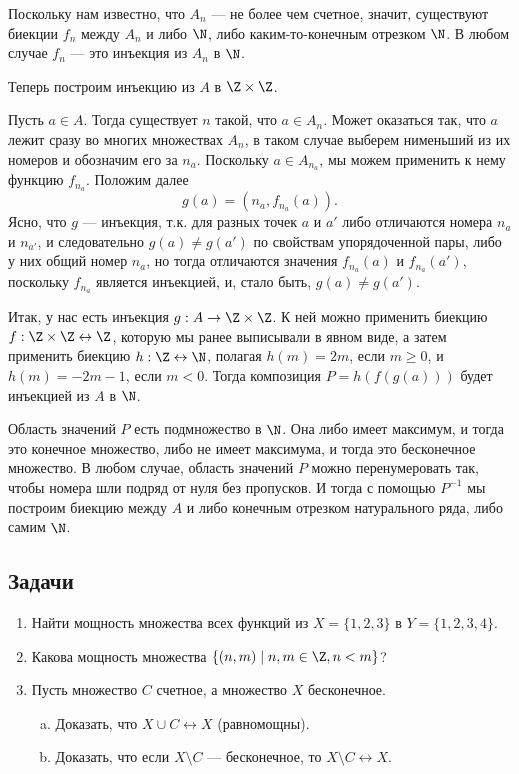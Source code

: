 \begin{enumerate}
Поскольку нам известно, что $A_n$ --- не более чем счетное, значит, существуют биекции $f_n$ между $A_n$ и либо $\N$, либо каким-то-конечным отрезком $\N$. В любом случае $f_n$ --- это инъекция из $A_n$ в $\N$.

Теперь построим инъекцию из $A$ в $\Z\times\Z$.

Пусть $a\in A$. Тогда существует $n$ такой, что $a\in A_n$. Может оказаться так, что $a$ лежит сразу во многих множествах $A_n$, в таком случае выберем нименьший из их номеров и обозначим его за $n_a$. Поскольку $a\in A_{n_a}$, мы можем применить к нему функцию $f_{n_a}$. Положим далее
$$
g(a) = (n_a,f_{n_a}(a)).
$$
Ясно, что $g$ --- инъекция, т.к. для разных точек $a$ и $a'$ либо отличаются номера $n_a$ и $n_{a'}$, и следовательно $g(a)\ne g(a')$ по свойствам упорядоченной пары, либо у них общий номер $n_a$, но тогда отличаются значения $f_{n_a}(a)$ и $f_{n_a}(a')$, поскольку $f_{n_a}$ является инъекцией, и, стало быть, $g(a)\ne g(a')$.

Итак, у нас есть инъекция $g:A\to\Z\times\Z$. К ней можно применить биекцию $f:\Z\times\Z\leftrightarrow\Z$, которую мы ранее выписывали в явном виде, а затем применить биекцию $h:\Z\leftrightarrow\N$, полагая $h(m)=2m$, если $m\ge 0$, и $h(m)=-2m-1$, если $m<0$. Тогда композиция $P=h(f(g(a)))$ будет инъекцией из $A$ в $\N$.

Область значений $P$ есть подмножество в $\N$. Она либо имеет максимум, и тогда это конечное множество, либо не имеет максимума, и тогда это бесконечное множество. В любом случае, область значений $P$ можно перенумеровать так, чтобы номера шли подряд от нуля без пропусков. И тогда с помощью $P^{-1}$ мы построим биекцию между $A$ и либо конечным отрезком натурального ряда, либо самим $\N$.\epf

\end{enumerate}


\subsection*{Задачи}

\begin{enumerate}
\item Найти мощность множества всех функций из $X=\{1,2,3\}$ в $Y=\{1,2,3,4\}$.
\item Какова мощность множества $\{(n,m)\mid n,m\in\Z, n<m\}$?
\item Пусть множество $C$ счетное, а множество $X$ бесконечное.
\begin{enumerate}[a)]
\item Доказать, что $X\cup C\leftrightarrow X$ (равномощны).
\item Доказать, что если $X\setminus C$ --- бесконечное, то $X\setminus C\leftrightarrow X$.
\end{enumerate}
\end{enumerate}

